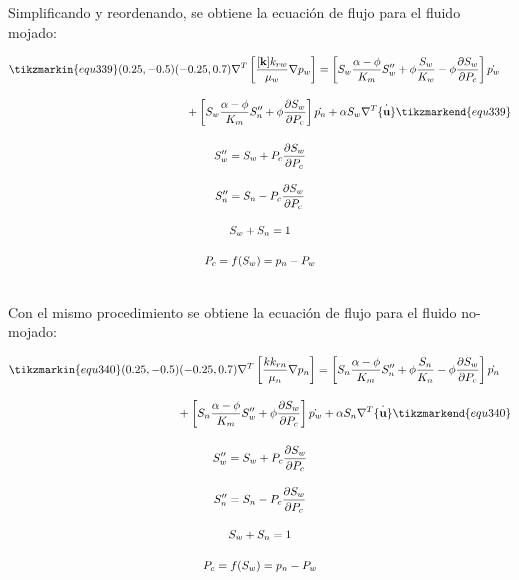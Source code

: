Simplificando y reordenando, se obtiene la ecuación de flujo para el fluido mojado:
\\
\begin{ceqn} 
\begin{subequations} \label{eq:equ345} 
\begin{gather}
\begin{multlined}
\tikzmarkin{equ339}(0.25,-0.5)(-0.25,0.7)
\nabla^T \left[\frac{[\mathbf{k}] k_{rw}}{\mu_{w}}\nabla p_w\right] = \left[S_w \frac{\alpha - \phi}{K_m}S''_w + \phi\frac{S_w}{K_w} - \phi\frac{\partial S_w}{\partial P_c}\right]\dot{p_w} \\[10pt]
+ \left[S_w \frac{\alpha - \phi}{K_m}S''_n + \phi\frac{\partial S_w}{\partial P_c}\right]\dot{p_n} +\alpha S_w \nabla^T \dot{\{\mathbf{u}\}} \tikzmarkend{equ339} \label{eq:equ345a}
\end{multlined}\\[12pt]
S''_w = S_w + P_c\frac{\partial S_w}{\partial P_c}  \label{eq:equ345b}\\[10pt]
S''_n = S_n - P_c\frac{\partial S_w}{\partial P_c}  \label{eq:equ345c}\\[10pt]
S_w + S_n = 1 \label{eq:equ345d}\\[12pt]
P_c = f(S_w) = p_n - P_w  \label{eq:equ345e}
\end{gather}  
\end{subequations} 
\end{ceqn}
\\
Con el mismo procedimiento se obtiene la ecuación de flujo para el fluido no-mojado:
\\
\begin{ceqn} 
\begin{subequations} \label{eq:equ346} 
\begin{gather}
\begin{multlined}
\tikzmarkin{equ340}(0.25,-0.5)(-0.25,0.7)
\nabla^T \left[\frac{k k_{rn}}{\mu_{n}}\nabla p_n\right] = \left[S_n \frac{\alpha - \phi}{K_m}S''_n + \phi\frac{S_n}{K_n} - \phi\frac{\partial S_w}{\partial P_c}\right]\dot{p_n} \\[10pt]
+ \left[S_n \frac{\alpha - \phi}{K_m}S''_w + \phi\frac{\partial S_w}{\partial P_c}\right]\dot{p_w} +\alpha S_n \nabla^T \dot{\{\mathbf{u}\}} \tikzmarkend{equ340} \label{eq:equ346a}
\end{multlined}\\[12pt]
S''_w = S_w + P_c\frac{\partial S_w}{\partial P_c}  \label{eq:equ346b}\\[10pt]
S''_n = S_n - P_c\frac{\partial S_w}{\partial P_c}  \label{eq:equ346c}\\[10pt]
S_w + S_n = 1 \label{eq:equ346d}\\[12pt]
P_c = f(S_w) = p_n - P_w  \label{eq:equ346e}
\end{gather}  
\end{subequations} 
\end{ceqn}
